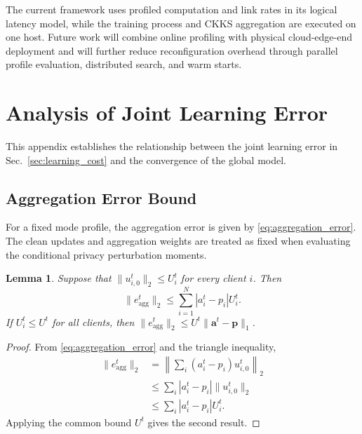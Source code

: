 \documentclass[5p,times]{elsarticle}
\theoremstyle{plain}
\newtheorem{lemma}[theorem]{Lemma}
\theoremstyle{definition}
\theoremstyle{remark}
\begin{document}
The current framework uses profiled computation and link rates in its logical
latency model, while the training process and CKKS aggregation are executed on
one host. Future work will combine online profiling with physical
cloud-edge-end deployment and will further reduce reconfiguration overhead
through parallel profile evaluation, distributed search, and warm starts.

\appendix
\section{Analysis of Joint Learning Error}
\label{app:convergence_proof}

This appendix establishes the relationship
between the joint learning error in
Sec.~\ref{sec:learning_cost} and the
convergence of the global model.

\subsection{Aggregation Error Bound}

For a fixed mode profile, the aggregation
error is given by
\eqref{eq:aggregation_error}.
The clean updates and aggregation weights
are treated as fixed when evaluating the
conditional privacy perturbation moments.

\begin{lemma}
\label{lem:aggregation_error}
Suppose that
\(\|u_{i,0}^t\|_2\le U_i^t\)
for every client \(i\). Then
\begin{equation}
\|e_{\mathrm{agg}}^t\|_2
\le
\sum_{i=1}^{N}
|a_i^t-p_i|U_i^t.
\label{eq:app_aggregation_bound}
\end{equation}
If \(U_i^t\le U^t\) for all clients, then
\(
\|e_{\mathrm{agg}}^t\|_2
\le U^t\|\mathbf a^t-\mathbf p\|_1
\).
\end{lemma}

\begin{proof}
From \eqref{eq:aggregation_error}
and the triangle inequality,
\begin{equation}
\begin{aligned}
\|e_{\mathrm{agg}}^t\|_2
&=
\left\|
\sum_i(a_i^t-p_i)u_{i,0}^t
\right\|_2\\
&\le
\sum_i |a_i^t-p_i|
\|u_{i,0}^t\|_2\\
&\le
\sum_i |a_i^t-p_i|U_i^t.
\end{aligned}
\end{equation}
Applying the common bound \(U^t\)
gives the second result.
\end{proof}
\end{document}
